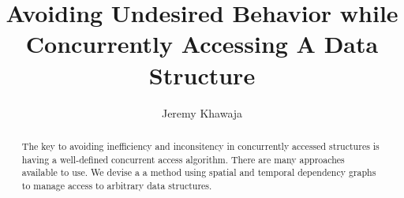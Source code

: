 \documentclass[english]{article}
\begin{document}
	
\hypersetup{
	colorlinks=true, %
	linktoc=all,     %
	linkcolor=blue,  %
}

\onecolumn
\title{Avoiding Undesired Behavior while Concurrently Accessing A Data Structure}
\author{Jeremy Khawaja}
\maketitle

\begin{abstract}
		The key to avoiding inefficiency and inconsitency in concurrently accessed structures is having a well-defined concurrent access algorithm. There are many approaches available to use. We devise a a method using spatial and temporal dependency graphs to manage access to arbitrary data structures.
\end{abstract}
\twocolumn








\onecolumn
\end{document}
